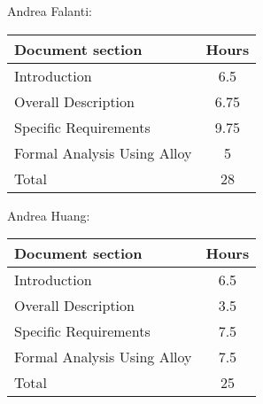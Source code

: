 Andrea Falanti:

\begin{tabular}{|l|c|}
    \hline
    Document section & Hours \\
    \hline
     Introduction & 6.5\\
     Overall Description & 6.75\\
     Specific Requirements & 9.75\\
     Formal Analysis Using Alloy & 5\\
     \hline
     Total & 28\\
     \hline
\end{tabular}
\vskip 0.3in

Andrea Huang:

\begin{tabular}{|l|c|}
    \hline
    Document section & Hours \\
    \hline
     Introduction &  6.5\\
     Overall Description & 3.5\\
     Specific Requirements & 7.5\\
     Formal Analysis Using Alloy & 7.5\\
     \hline
     Total & 25\\
     \hline
\end{tabular}